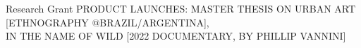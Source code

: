 \begin{cvtable}
{{    Research Grant
	}}
	{
	}
	{
{\scriptsize PRODUCT LAUNCHES:
MASTER THESIS ON URBAN ART [ETHNOGRAPHY @BRAZIL/ARGENTINA], \\
IN THE NAME OF WILD [2022 DOCUMENTARY, BY PHILLIP VANNINI]
} \\
	\wt{%
	}
	}
\end{cvtable}


